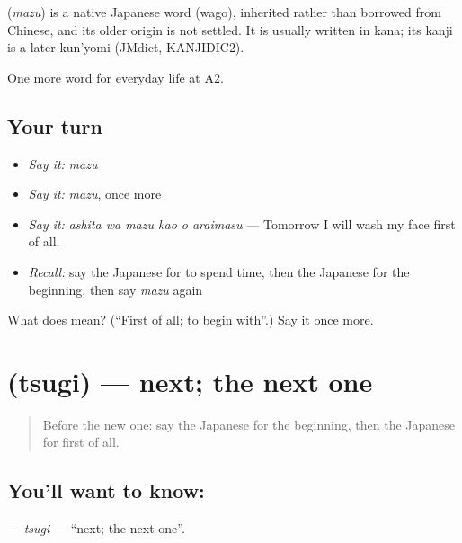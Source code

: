 \begin{cousinweb}
\textbf{} (\emph{mazu}) is a native Japanese word (wago), inherited rather than borrowed from Chinese, and its older origin is not settled. It is usually written in kana; its kanji is a later kun'yomi (JMdict, KANJIDIC2).
\end{cousinweb}

\begin{grammarlens}[title={What you've built}]
One more word for everyday life at A2.
\end{grammarlens}

\subsection*{Your turn}
\begin{itemize}
\raggedright
  \item \emph{Say it:} \emph{mazu}
  \item \emph{Say it:} \emph{mazu}, once more
  \item \emph{Say it:} \emph{ashita wa mazu kao o araimasu} — Tomorrow I will wash my face first of all.
  \item \emph{Recall:} say the Japanese for to spend time, then the Japanese for the beginning, then say \emph{mazu} again
\end{itemize}

\begin{tcolorbox}[breakable,colback=teal!4,colframe=teal!35!black,title={Before you move on}]
What does  mean? (\textquotedblleft{}First of all; to begin with\textquotedblright{}.) Say it once more.
\end{tcolorbox}
\section[\texorpdfstring{\ja{つぎ} (tsugi)}{つぎ (tsugi)}]{ (tsugi) — next; the next one}

\label{lesson:JA-C171-tsugi}



\begin{quote}
Before the new one: say the Japanese for the beginning, then the Japanese for first of all.
\end{quote}

\subsection*{You'll want to know: }
\textbf{} — \emph{tsugi} — \textquotedblleft{}next; the next one\textquotedblright{}.

